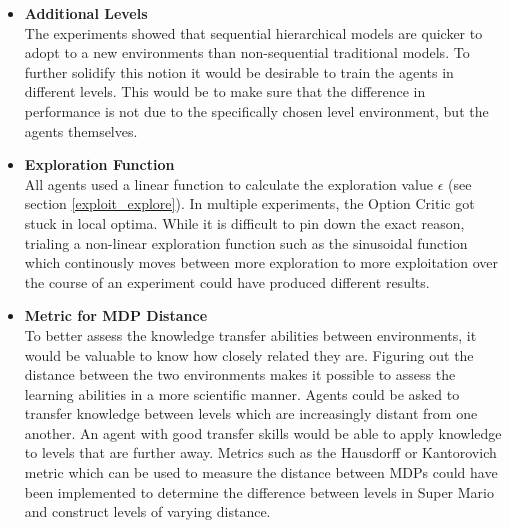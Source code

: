 \documentclass[notitlepage,a4paper,11pt]{article}
\begin{document}
\begin{itemize}
	
	\item
	\textbf{Additional Levels}\\
	The experiments showed that sequential hierarchical models are quicker to adopt to a new environments than non-sequential traditional models. To further solidify this notion it would be desirable to train the agents in different levels. This would be to make sure that the difference in performance is not due to the specifically chosen level environment, but the agents themselves.
	
	\item	
	\textbf{Exploration Function}\\
	All agents used a linear function to calculate the exploration value $\epsilon$ (see section \ref{exploit_explore}). In multiple experiments, the Option Critic got stuck in local optima. While it is difficult to pin down the exact reason, trialing a non-linear exploration function such as the sinusoidal function \cite{chuchro2017game} which continously moves between more exploration to more exploitation over the course of an experiment could have produced different results. 
	
	\item
	\textbf{Metric for MDP Distance}\\
	To better assess the knowledge transfer abilities between environments, it would be valuable to know how closely related they are. Figuring out the distance between the two environments makes it possible to assess the learning abilities in a more scientific manner. Agents could be asked to transfer knowledge between levels which are increasingly distant from one another. An agent with good transfer skills would be able to apply knowledge to levels that are further away. Metrics such as the Hausdorff or Kantorovich metric which can be used to measure the distance between MDPs \cite{song2016measuring} could have been implemented to determine the difference between levels in Super Mario and construct levels of varying distance.
	
	

\end{itemize}
\end{document}
